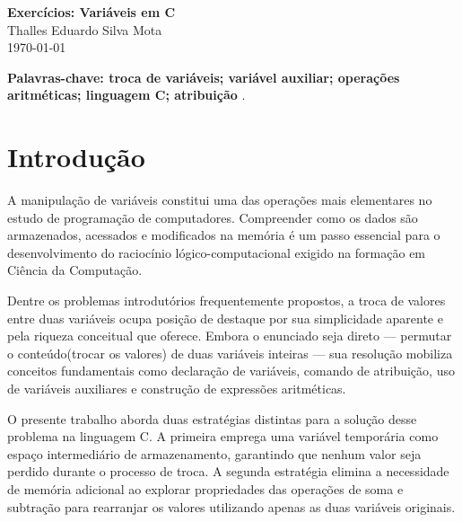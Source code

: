 \documentclass[12pt, a4paper]{article}
\newcommand{\NomeAluno}{Thalles Eduardo Silva Mota}             %
\begin{document}
\begin{center}
  {\Large\bfseries\color{ufmtAzul} Exercícios: Variáveis em C}\\[6pt]
  {\large \NomeAluno}\\[3pt]
  {\normalsize\color{ufmtCinza} \today}
\end{center}

\vspace{0.5cm}

\begin{abstract}
    \textbf{Este trabalho apresenta duas soluções para o problema clássico de 
    troca de valores entre duas variáveis inteiras na linguagem C. A primeira 
    abordagem utiliza uma variável auxiliar temporária para preservar um dos 
    valores durante a permutação. A segunda abordagem realiza a troca 
    exclusivamente por meio de operações aritméticas de soma e subtração, 
    dispensando memória adicional. Ambas as implementações demonstram conceitos 
    fundamentais de manipulação de variáveis, atribuição e expressões aritméticas 
    em programação estruturada.}
\end{abstract}

\noindent\textbf{Palavras-chave: troca de variáveis; variável auxiliar; 
operações aritméticas; linguagem C; atribuição} .

\section*{Introdução}
  A manipulação de variáveis constitui uma das operações mais elementares no 
  estudo de programação de computadores. Compreender como os dados são 
  armazenados, acessados e modificados na memória é um passo essencial para o 
  desenvolvimento do raciocínio lógico-computacional exigido na formação em 
  Ciência da Computação.


Dentre os problemas introdutórios frequentemente propostos, a troca de valores 
entre duas variáveis ocupa posição de destaque por sua simplicidade aparente e 
pela riqueza conceitual que oferece. Embora o enunciado seja direto — permutar 
o conteúdo(trocar os valores) de duas variáveis inteiras — sua resolução mobiliza 
conceitos fundamentais como declaração de variáveis, comando de atribuição, 
uso de variáveis auxiliares e construção de expressões aritméticas.


O presente trabalho aborda duas estratégias distintas para a solução desse 
problema na linguagem C. A primeira emprega uma variável temporária como espaço 
intermediário de armazenamento, garantindo que nenhum valor seja perdido durante 
o processo de troca. A segunda estratégia elimina a necessidade de memória 
adicional ao explorar propriedades das operações de soma e subtração para 
rearranjar os valores utilizando apenas as duas variáveis originais.
\end{document}
